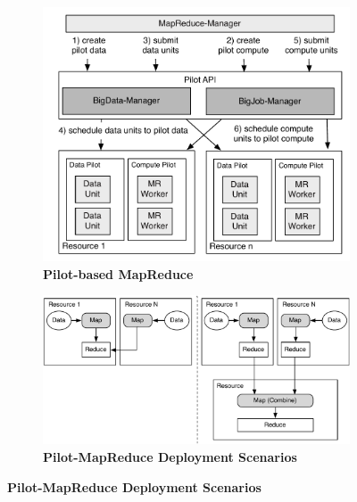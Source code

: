 \documentclass[]{paper}
\begin{document}
\begin{figure}[t]
	\begin{subfigure}[b]{0.5\textwidth}
                \centering
                \includegraphics[width=1\textwidth]{figures/mr-arch.pdf}
                \caption{\textbf{Pilot-based MapReduce}}
                \label{fig:mr_arch}
        \end{subfigure}
	\begin{subfigure}[b]{0.5\textwidth}
                \centering
                \includegraphics[width=1\textwidth,height=.8\textwidth]{figures/distributed_hierachical.pdf}
                \caption{\textbf{Pilot-MapReduce Deployment Scenarios}}
                \label{fig:mrtop}
        \end{subfigure}


\end{figure}
\end{document}

